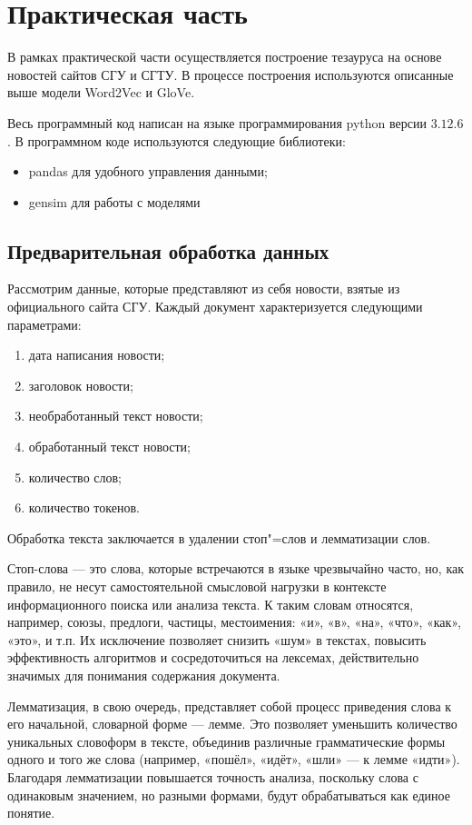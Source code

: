 \documentclass[coursework]{SCWorks}
\begin{document}
\section{Практическая часть}
В рамках практической части осуществляется построение тезауруса на основе новостей сайтов СГУ и СГТУ. В процессе построения используются описанные выше модели Word2Vec и GloVe.

Весь программный код написан на языке программирования python версии $3.12.6$. В программном коде используются следующие библиотеки:
\begin{itemize}
  \item pandas для удобного управления данными;
  \item gensim для работы с моделями
\end{itemize}
\subsection{Предварительная обработка данных}
Рассмотрим данные, которые представляют из себя новости, взятые из официального сайта СГУ. Каждый документ характеризуется следующими параметрами:
\begin{enumerate}
  \item дата написания новости;
  \item заголовок новости;
  \item необработанный текст новости;
  \item обработанный текст новости;
  \item количество слов;
  \item количество токенов.
\end{enumerate}

Обработка текста заключается в удалении стоп"=слов и лемматизации слов.

Стоп-слова — это слова, которые встречаются в языке чрезвычайно часто, но, как правило, не несут самостоятельной смысловой нагрузки в контексте информационного поиска или анализа текста. К таким словам относятся, например, союзы, предлоги, частицы, местоимения: «и», «в», «на», «что», «как», «это», и т.п. Их исключение позволяет снизить «шум» в текстах, повысить эффективность алгоритмов и сосредоточиться на лексемах, действительно значимых для понимания содержания документа.
  
Лемматизация, в свою очередь, представляет собой процесс приведения слова к его начальной, словарной форме — лемме. Это позволяет уменьшить количество уникальных словоформ в тексте, объединив различные грамматические формы одного и того же слова (например, «пошёл», «идёт», «шли» — к лемме «идти»). Благодаря лемматизации повышается точность анализа, поскольку слова с одинаковым значением, но разными формами, будут обрабатываться как единое понятие.
\end{document}
